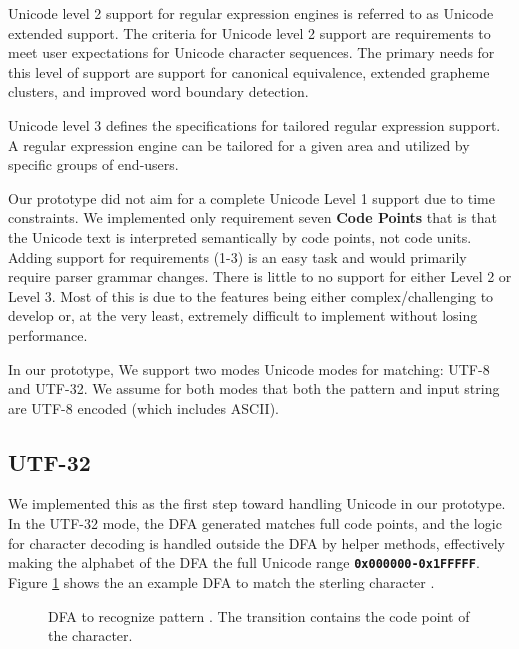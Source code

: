 Unicode level 2 support for regular expression engines is referred to as Unicode extended support. The criteria for Unicode level 2 support are requirements to meet user expectations for Unicode character sequences. The primary needs for this level of support are support for canonical equivalence, extended grapheme clusters, and improved word boundary detection.

Unicode level 3 defines the specifications for tailored regular expression support. A regular expression engine can be tailored for a given area and utilized by specific groups of end-users.

Our prototype did not aim for a complete Unicode Level 1 support due to time constraints. We implemented only requirement seven \textbf{Code Points} that is that the Unicode text is interpreted semantically by code points, not code units. Adding support for requirements (1-3) is an easy task and would primarily require parser grammar changes. There is little to no support for either Level 2 or Level 3. Most of this is due to the features being either complex/challenging to develop or, at the very least, extremely difficult to implement without losing performance.

In our prototype, We support two modes Unicode modes for matching: UTF-8 and UTF-32. We assume for both modes that both the pattern and input string are UTF-8 encoded (which includes ASCII).

\subsection{UTF-32}
We implemented this as the first step toward handling Unicode in our prototype. 
In the UTF-32 mode, the DFA generated matches full code points, and the logic for character decoding is handled outside the DFA by helper methods, effectively making the alphabet of the DFA the full Unicode range \texttt{\textbf{0x000000-0x1FFFFF}}. Figure \ref{fig:utf32exdfa} shows the an example DFA to match the sterling character \texttt{\textsterling}.

\begin{figure}[H]
\centering
\usetikzlibrary{fit}
\caption[DFA to recognize pattern \texttt{\textsterling}]{DFA to recognize pattern \texttt{\textsterling}. The transition contains the code point of the character.}
\label{fig:utf32exdfa}
\end{figure}

